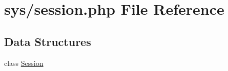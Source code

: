 \hypertarget{session_8php}{}\section{sys/session.php File Reference}
\label{session_8php}
\subsection*{Data Structures}
\begin{DoxyCompactItemize}
\item 
class \hyperlink{classSession}{Session}
\end{DoxyCompactItemize}
